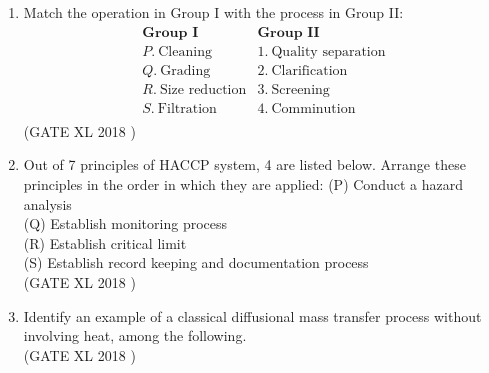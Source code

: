 \documentclass[14pt]{extarticle}
\begin{document}
\begin{flushleft}
\begin{enumerate}
\item Match the operation in Group I with the process in Group II:
\[
\begin{array}{ll}
\textbf{Group I} & \textbf{Group II} \\
P. \ \text{Cleaning} & 1. \ \text{Quality separation} \\
Q. \ \text{Grading} & 2. \ \text{Clarification} \\
R. \ \text{Size reduction} & 3. \ \text{Screening} \\
S. \ \text{Filtration} & 4. \ \text{Comminution} \\
\end{array}
\]
\hfill(GATE XL 2018 )\\

\begin{enumerate}
\end{enumerate}

\item Out of 7 principles of HACCP system, 4 are listed below. Arrange these principles in the order in which they are applied:
(P) Conduct a hazard analysis \\
(Q) Establish monitoring process \\
(R) Establish critical limit \\
(S) Establish record keeping and documentation process\\
\hfill(GATE XL 2018 )\\

\begin{enumerate}
\end{enumerate}

\item Identify an example of a classical diffusional mass transfer process without involving heat, among the following.\\
\hfill(GATE XL 2018 )\\


\end{enumerate}
\end{flushleft}
\end{document}
